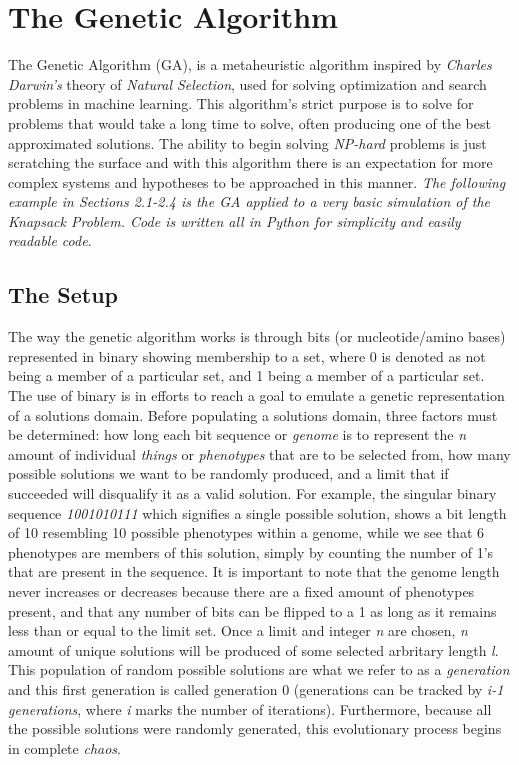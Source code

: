 \section{The Genetic Algorithm}
\label{sec: the genetic algorithm}

The Genetic Algorithm (GA), is a metaheuristic algorithm inspired by \emph{Charles Darwin's} theory of \emph{Natural Selection}, used for solving optimization and search problems in machine learning. This algorithm's strict purpose is to solve for problems that would take a long time to solve, often producing one of the best approximated solutions. The ability to begin solving \emph{NP-hard} problems is just scratching the surface and with this algorithm there is an expectation for more complex systems and hypotheses to be approached in this manner. \emph{The following example in Sections 2.1-2.4 is the GA applied to a very basic simulation of the Knapsack Problem. Code is written all in Python for simplicity and easily readable code}.

\subsection{The Setup}
\label{setup} 

The way the genetic algorithm works is through bits (or nucleotide/amino bases) represented in binary showing membership to a set, where 0 is denoted as not being a member of a particular set, and 1 being a member of a particular set. The use of binary is in efforts to reach a goal to emulate a genetic representation of a solutions domain. 
Before populating a solutions domain, three factors must be determined: how long each bit sequence or \emph{genome} is to represent the \emph{n}  amount of individual \emph{things} or \emph{phenotypes} that are to be selected from, how many possible solutions we want to be randomly produced, and a limit that if succeeded will disqualify it as a valid solution. For example, the singular binary sequence \emph{1001010111} which signifies a single possible solution, shows a bit length of 10 resembling 10 possible phenotypes within a genome, while we see that 6 phenotypes are members of this solution, simply by counting the number of 1's that are present in the sequence. It is important to note that the genome length never increases or decreases because there are a fixed amount of phenotypes present, and that any number of bits can be flipped to a 1 as long as it remains less than or equal to the limit set. Once a limit and integer \emph{n} are chosen, \emph{n} amount of unique solutions will be produced of some selected arbritary length \emph{l}. This population of random possible solutions are what we refer to as a \emph{generation} and this first generation is called generation 0 (generations can be tracked by \emph{i-1 generations}, where \emph{i} marks the number of iterations). Furthermore, because all the possible solutions were randomly generated, this evolutionary process begins in complete \emph{chaos}.

